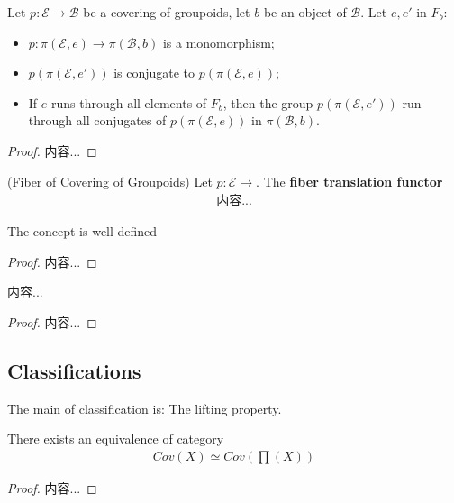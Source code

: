 \documentclass[Total.tex]{subfiles}
\begin{document}
			\begin{proposition}
				Let $p:\mathscr E\rightarrow \mathscr B$ be a covering of groupoids, let $b$ be an object of $\mathscr B$. Let $e,e'$ in $F_b$:
				\begin{itemize}
					\item $p:\pi(\mathscr E,e)\rightarrow \pi(\mathscr B,b)$ is a monomorphism;
					\item $p(\pi(\mathscr E,e'))$ is conjugate to $p(\pi(\mathscr E,e))$;
					\item If $e$ runs through all elements of $F_b$, then the group $p(\pi(\mathscr E,e'))$ run through all conjugates of $p(\pi(\mathscr E,e))$ in $\pi(\mathscr B,b)$.
				\end{itemize}
			\end{proposition}
			\begin{proof}
				内容...
			\end{proof}
			\begin{Def}
				(Fiber of Covering of Groupoids) Let $p:\mathscr E\rightarrow $. The \textbf{fiber translation functor}
				\begin{gather*}
					内容...
				\end{gather*}
			\end{Def}
			
			\begin{proposition}
				The concept is well-defined
			\end{proposition}
			\begin{proof}
				内容...
			\end{proof}
			
			\begin{proposition}
				内容...
			\end{proposition}
			\begin{proof}
				内容...
			\end{proof}
			\subsection{Classifications}
				The main  of classification is: The lifting property.
				
				\begin{theorem}
					There exists an equivalence of category
					\begin{gather*}
						Cov(X)\simeq Cov(\prod(X))
					\end{gather*}
				\end{theorem}
				\begin{proof}
					内容...
				\end{proof}
				
\end{document}
